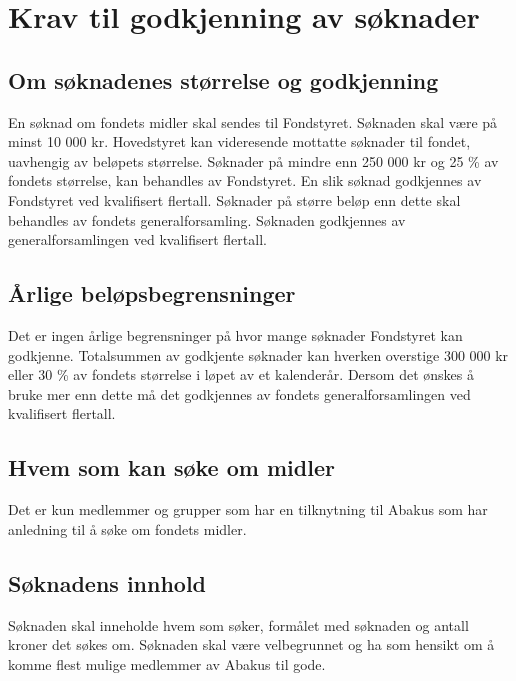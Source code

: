 \section{Krav til godkjenning av søknader}
\subsection{Om søknadenes størrelse og godkjenning}
En søknad om fondets midler skal sendes til Fondstyret. Søknaden skal være
på minst 10 000 kr. Hovedstyret kan videresende mottatte søknader til fondet,
uavhengig av beløpets størrelse. Søknader på mindre enn 250 000 kr og 25 \% av
fondets størrelse, kan behandles av Fondstyret. En slik søknad godkjennes av
Fondstyret ved kvalifisert flertall. Søknader på
større beløp enn dette skal behandles av fondets generalforsamling. Søknaden
godkjennes av generalforsamlingen ved kvalifisert flertall.

\subsection{Årlige beløpsbegrensninger}
Det er ingen årlige begrensninger på hvor mange søknader Fondstyret kan
godkjenne. Totalsummen av godkjente søknader kan hverken overstige 300 000 kr
eller 30 \% av fondets størrelse i løpet av et kalenderår. Dersom det ønskes å
bruke mer enn dette må det godkjennes av fondets generalforsamlingen ved
kvalifisert flertall.

\subsection{Hvem som kan søke om midler}
Det er kun medlemmer og  grupper som har en tilknytning til Abakus som har
anledning til å søke om fondets midler.

\subsection{Søknadens innhold}
Søknaden skal inneholde hvem som søker, formålet med søknaden og antall kroner
det søkes om. Søknaden skal være velbegrunnet og ha som hensikt om å komme
flest mulige medlemmer av Abakus til gode.
